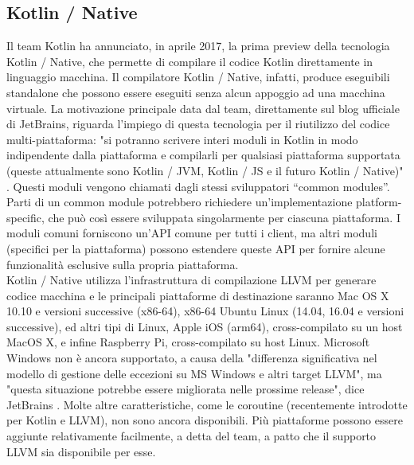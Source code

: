 \subsection{Kotlin / Native}
Il team Kotlin ha annunciato, in aprile 2017, la prima preview della tecnologia Kotlin / Native, che permette di compilare il codice Kotlin direttamente in linguaggio macchina. Il compilatore Kotlin / Native, infatti, produce eseguibili standalone che possono essere eseguiti senza alcun appoggio ad una macchina virtuale. La motivazione principale data dal team, direttamente sul blog ufficiale di JetBrains, riguarda l'impiego di questa tecnologia per il riutilizzo del codice multi-piattaforma: "si potranno scrivere interi moduli in Kotlin in modo indipendente dalla piattaforma e compilarli per qualsiasi piattaforma supportata (queste attualmente sono Kotlin / JVM, Kotlin / JS e il futuro Kotlin / Native)" \cite{kotlinNativePreview}. Questi moduli vengono chiamati dagli stessi sviluppatori “common modules”. Parti di un common module potrebbero richiedere un'implementazione platform-specific, che può così essere sviluppata singolarmente per ciascuna piattaforma. I moduli comuni forniscono un'API comune per tutti i client, ma altri moduli (specifici per la piattaforma) possono estendere queste API per fornire alcune funzionalità esclusive sulla propria piattaforma.\\
Kotlin / Native utilizza l'infrastruttura di compilazione LLVM per generare codice macchina e le principali piattaforme di destinazione saranno Mac OS X 10.10 e versioni successive (x86-64), x86-64 Ubuntu Linux (14.04, 16.04 e versioni successive), ed altri tipi di Linux, Apple iOS (arm64), cross-compilato su un host MacOS X, e infine Raspberry Pi, cross-compilato su host Linux. Microsoft Windows non è ancora supportato, a causa della "differenza significativa nel modello di gestione delle eccezioni su MS Windows e altri target LLVM", ma "questa situazione potrebbe essere migliorata nelle prossime release", dice JetBrains \cite{kotlinNativePreview}. Molte altre caratteristiche, come le coroutine (recentemente introdotte per Kotlin e LLVM), non sono ancora disponibili. Più piattaforme possono essere aggiunte relativamente facilmente, a detta del team, a patto che il supporto LLVM sia disponibile per esse.\\

